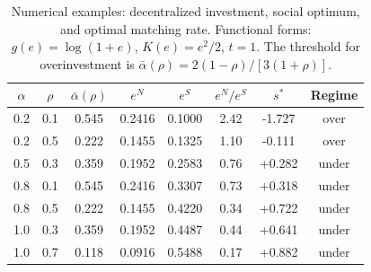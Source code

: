 
\begin{table}[tbp]
\centering
\caption{Numerical examples: decentralized investment, social optimum, and optimal matching rate.
  Functional forms: $g(e)=\log(1+e)$, $K(e)=e^2/2$, $t=1$.
  The threshold for overinvestment is $\bar\alpha(\rho)=2(1-\rho)/[3(1+\rho)]$.}
\label{tab:numerical}
\smallskip
\begin{tabular}{cccccccc}
\toprule
$\alpha$ & $\rho$ & $\bar\alpha(\rho)$ & $e^N$ & $e^S$ & $e^N/e^S$ & $s^*$ & Regime \\
\midrule
  0.2 & 0.1 & 0.545 & 0.2416 & 0.1000 & 2.42 & -1.727 & over \\
  0.2 & 0.5 & 0.222 & 0.1455 & 0.1325 & 1.10 & -0.111 & over \\
  0.5 & 0.3 & 0.359 & 0.1952 & 0.2583 & 0.76 & +0.282 & under \\
  0.8 & 0.1 & 0.545 & 0.2416 & 0.3307 & 0.73 & +0.318 & under \\
  0.8 & 0.5 & 0.222 & 0.1455 & 0.4220 & 0.34 & +0.722 & under \\
  1.0 & 0.3 & 0.359 & 0.1952 & 0.4487 & 0.44 & +0.641 & under \\
  1.0 & 0.7 & 0.118 & 0.0916 & 0.5488 & 0.17 & +0.882 & under \\
\bottomrule
\end{tabular}
\end{table}
